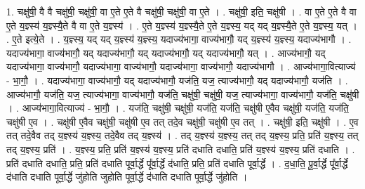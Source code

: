 \documentclass[17pt]{extarticle}
\begin{document}
1. चक्षु॑षी॒ वै वै चक्षु॑षी॒ चक्षु॑षी॒ वा ए॒ते ए॒ते वै चक्षु॑षी॒ चक्षु॑षी॒ वा ए॒ते । . चक्षु॑षी॒ इति॒ चक्षु॑षी । . वा ए॒ते ए॒ते वै वा ए॒ते य॒ज्ञ्स्य॑ य॒ज्ञ्स्यै॒ते वै वा ए॒ते य॒ज्ञ्स्य॑ । . ए॒ते य॒ज्ञ्स्य॑ य॒ज्ञ्स्यै॒ते ए॒ते य॒ज्ञ्स्य॒ यद् यद् य॒ज्ञ्स्यै॒ते ए॒ते य॒ज्ञ्स्य॒ यत् । . ए॒ते इत्ये॒ते । . य॒ज्ञ्स्य॒ यद् यद् य॒ज्ञ्स्य॑ य॒ज्ञ्स्य॒ यदाज्य॑भागा॒ वाज्य॑भागौ॒ यद् य॒ज्ञ्स्य॑ य॒ज्ञ्स्य॒ यदाज्य॑भागौ । . यदाज्य॑भागा॒ वाज्य॑भागौ॒ यद् यदाज्य॑भागौ॒ यद् यदाज्य॑भागौ॒ यद् यदाज्य॑भागौ॒ यत् । . आज्य॑भागौ॒ यद् यदाज्य॑भागा॒ वाज्य॑भागौ॒ यदाज्य॑भागा॒ वाज्य॑भागौ॒ यदाज्य॑भागा॒ वाज्य॑भागौ॒ यदाज्य॑भागौ । . आज्य॑भागा॒वित्याज्य॑ - भा॒गौ॒ । . यदाज्य॑भागा॒ वाज्य॑भागौ॒ यद् यदाज्य॑भागौ॒ यज॑ति॒ यज॒ त्याज्य॑भागौ॒ यद् यदाज्य॑भागौ॒ यज॑ति । . आज्य॑भागौ॒ यज॑ति॒ यज॒ त्याज्य॑भागा॒ वाज्य॑भागौ॒ यज॑ति॒ चक्षु॑षी॒ चक्षु॑षी॒ यज॒ त्याज्य॑भागा॒ वाज्य॑भागौ॒ यज॑ति॒ चक्षु॑षी । . आज्य॑भागा॒वित्याज्य॑ - भा॒गौ॒ । . यज॑ति॒ चक्षु॑षी॒ चक्षु॑षी॒ यज॑ति॒ यज॑ति॒ चक्षु॑षी ए॒वैव चक्षु॑षी॒ यज॑ति॒ यज॑ति॒ चक्षु॑षी ए॒व । . चक्षु॑षी ए॒वैव चक्षु॑षी॒ चक्षु॑षी ए॒व तत् तदे॒व चक्षु॑षी॒ चक्षु॑षी ए॒व तत् । . चक्षु॑षी॒ इति॒ चक्षु॑षी । . ए॒व तत् तदे॒वैव तद् य॒ज्ञ्स्य॑ य॒ज्ञ्स्य॒ तदे॒वैव तद् य॒ज्ञ्स्य॑ । . तद् य॒ज्ञ्स्य॑ य॒ज्ञ्स्य॒ तत् तद् य॒ज्ञ्स्य॒ प्रति॒ प्रति॑ य॒ज्ञ्स्य॒ तत् तद् य॒ज्ञ्स्य॒ प्रति॑ । . य॒ज्ञ्स्य॒ प्रति॒ प्रति॑ य॒ज्ञ्स्य॑ य॒ज्ञ्स्य॒ प्रति॑ दधाति दधाति॒ प्रति॑ य॒ज्ञ्स्य॑ य॒ज्ञ्स्य॒ प्रति॑ दधाति । . प्रति॑ दधाति दधाति॒ प्रति॒ प्रति॑ दधाति पूर्वा॒र्द्धे पू᳚र्वा॒र्द्धे द॑धाति॒ प्रति॒ प्रति॑ दधाति पूर्वा॒र्द्धे । . द॒धा॒ति॒ पू॒र्वा॒र्द्धे पू᳚र्वा॒र्द्धे द॑धाति दधाति पूर्वा॒र्द्धे जु॑होति जुहोति पूर्वा॒र्द्धे द॑धाति दधाति पूर्वा॒र्द्धे जु॑होति । \newline
\end{document}
